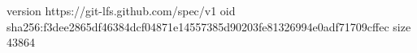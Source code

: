 version https://git-lfs.github.com/spec/v1
oid sha256:f3dee2865df46384dcf04871e14557385d90203fe81326994e0adf71709cffec
size 43864
